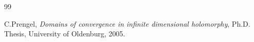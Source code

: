 \documentclass[a4paper,12pt]{amsart}
\theoremstyle{definition}
\begin{document}
\begin{thebibliography}{99}
	
	
	
	
	
	
	
	
	 {\sc C.Prengel}, {\it Domains of convergence in infinite dimensional holomorphy}, Ph.D. Thesis, University of Oldenburg, 2005.
	
	
	

\end{thebibliography}
\end{document}
